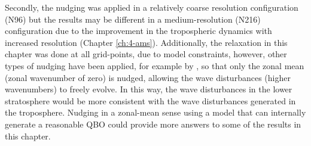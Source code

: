 Secondly, the nudging was applied in a relatively coarse resolution configuration (N96) but the results may be different in a medium-resolution (N216) configuration due to the improvement in the tropospheric dynamics with increased resolution (Chapter \ref{ch:4-ams}).  
Additionally, the relaxation in this chapter was done at all grid-points, due to model constraints, however, other types of nudging have been applied, for example by \cite{martin2021}, so that only the zonal mean (zonal wavenumber of zero) is nudged, allowing the wave disturbances (higher wavenumbers) to freely evolve. In this way, the wave disturbances in the lower stratosphere would be more consistent with the wave disturbances generated in the troposphere. Nudging in a zonal-mean sense using a model that can internally generate a reasonable QBO could provide more answers to some of the results in this chapter.

